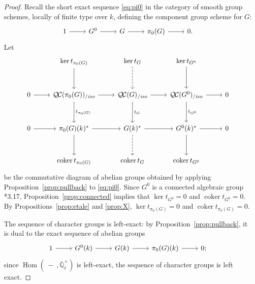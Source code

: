 \documentclass[11pt]{amsart}
\theoremstyle{plain}
\theoremstyle{definition}
\theoremstyle{remark}
\newcommand{\EE}{\mathbb{\bar Q}_\ell}
\newcommand{\Fq}{k}
\newcommand{\EEx}{\EE^\times}
\DeclareMathOperator{\Hom}{Hom}
\DeclareMathOperator{\coker}{coker}
\newcommand{\QC}{{\mathcal{Q\hskip-0.8pt C}}}
\newcommand{\QCiso}[1]{\QC(#1)_{/\textit{iso}}}
\newcommand{\trFrob}[1]{t_{#1}}
\begin{document}
\begin{proof}
  Recall the short exact sequence \eqref{eq:pi0} in the category of smooth group
  schemes, locally of finite type over $\Fq$, defining the component
  group scheme for $G$:
  \[
  \begin{tikzcd}
    1 \rar & G^0 \rar & G \rar & \pi_0(G) \rar & 0.
  \end{tikzcd}
  \]
  Let
  \[
  \begin{tikzcd}[row sep=30]
    {}& \ker \trFrob{\pi_0(G)} \dar & \arrow[dashed]{d} \ker \trFrob{G} & \ker \trFrob{G^0} \dar & \\
    0 \rar & \QCiso{\pi_0(G)} \rar \dar{\trFrob{\pi_0(G)}}
    & \QCiso{G} \rar \dar{\trFrob{G}} & \QCiso{G^0} \rar \dar{\trFrob{G^0}} & 0\\
    0 \rar & \pi_0(G)(\Fq)^* \rar \dar
    & \arrow[dashed]{d} G(\Fq)^* \rar & G^0(\Fq)^* \rar \dar & 0\\
    & \coker \trFrob{\pi_0(G)} & \coker \trFrob{G} &  \coker \trFrob{G^0} &
  \end{tikzcd}
  \]
  be the commutative diagram of abelian groups obtained by applying
  Proposition~\ref{prop:pullback} to \eqref{eq:pi0}.  Since $G^0$ is a connected algebraic group
  \cite{vdGeer-Moonen:AbelianVarieties}*{3.17},
  Proposition~\ref{prop:connected} implies that $\ker \trFrob{G^0} =0$ and $\coker \trFrob{G^0}=0$.
  By Propositions~\ref{prop:etale} and \ref{prop:X}, $\ker \trFrob{\pi_0(G)}=0$
  and $\coker \trFrob{\pi_0(G)}=0$.

  The sequence of character groups is left-exact: by
  Proposition~\ref{prop:pullback}, it is dual to the exact sequence of
  abelian groups
  \begin{equation}\label{eq:pi0k}
  \begin{tikzcd}
    1 \rar & G^0(\Fq) \rar & G(\Fq) \rar & \pi_0(G)(\Fq) \rar & 0;
  \end{tikzcd}
  \end{equation}
  since $\Hom(\ - \ ,\EEx)$ is left-exact, the sequence of
  character groups is left exact.


\end{proof}
\end{document}
